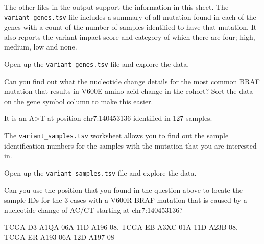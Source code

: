 \begin{information}
The other files in the output support the information in this sheet.
\vspace{4 mm}
The \texttt{variant\_genes.tsv} file includes a summary of all mutation found in each of the genes with a count
of the number of samples identified to have that mutation. It also reports the variant impact score
and category of which there are four; high, medium, low and none.
\end{information}

\begin{steps}
Open up the \texttt{variant\_genes.tsv} file and explore the data. 
\end{steps}

\begin{questions} 
Can you find out what the nucleotide change details for the most common BRAF mutation that results
in V600E amino acid change in the cohort?
Sort the data on the gene symbol column to make this easier.
\end{questions}

\begin{answer}
It is an A>T at position chr7:140453136 identified in 127 samples.
\end{answer}

\begin{information}
The \texttt{variant\_samples.tsv} worksheet allows you to find out the sample identification numbers
for the samples with the mutation that you are interested in.
\end{information}

\begin{steps}
Open up the \texttt{variant\_samples.tsv} file and explore the data. 
\end{steps}

\begin{questions}
Can you use the position that you found in the question above to locate the sample IDs for the 3
cases with a V600R BRAF mutation that is caused by a nucleotide change of AC/CT starting at chr7:140453136?
\end{questions}

\begin{answer}
TCGA-D3-A1QA-06A-11D-A196-08, TCGA-EB-A3XC-01A-11D-A23B-08, TCGA-ER-A193-06A-12D-A197-08
\end{answer}



